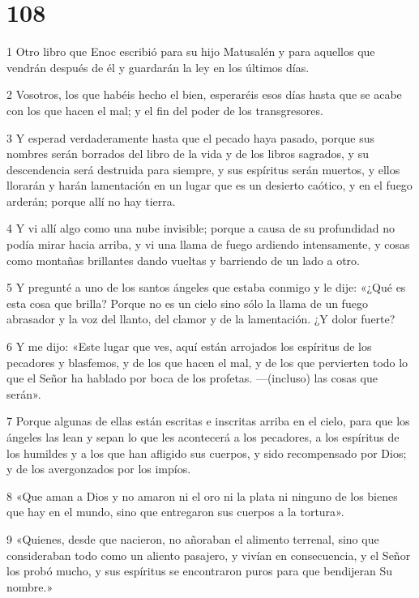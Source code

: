 \chapter{108}

\par 1 Otro libro que Enoc escribió para su hijo Matusalén y para aquellos que vendrán después de él y guardarán la ley en los últimos días.
\par 2 Vosotros, los que habéis hecho el bien, esperaréis esos días hasta que se acabe con los que hacen el mal; y el fin del poder de los transgresores.
\par 3 Y esperad verdaderamente hasta que el pecado haya pasado, porque sus nombres serán borrados del libro de la vida y de los libros sagrados, y su descendencia será destruida para siempre, y sus espíritus serán muertos, y ellos llorarán y harán lamentación en un lugar que es un desierto caótico, y en el fuego arderán; porque allí no hay tierra.
\par 4 Y vi allí algo como una nube invisible; porque a causa de su profundidad no podía mirar hacia arriba, y vi una llama de fuego ardiendo intensamente, y cosas como montañas brillantes dando vueltas y barriendo de un lado a otro.
\par 5 Y pregunté a uno de los santos ángeles que estaba conmigo y le dije: «¿Qué es esta cosa que brilla? Porque no es un cielo sino sólo la llama de un fuego abrasador y la voz del llanto, del clamor y de la lamentación. ¿Y dolor fuerte?
\par 6 Y me dijo: «Este lugar que ves, aquí están arrojados los espíritus de los pecadores y blasfemos, y de los que hacen el mal, y de los que pervierten todo lo que el Señor ha hablado por boca de los profetas. —(incluso) las cosas que serán».
\par 7 Porque algunas de ellas están escritas e inscritas arriba en el cielo, para que los ángeles las lean y sepan lo que les acontecerá a los pecadores, a los espíritus de los humildes y a los que han afligido sus cuerpos, y sido recompensado por Dios; y de los avergonzados por los impíos.
\par 8 «Que aman a Dios y no amaron ni el oro ni la plata ni ninguno de los bienes que hay en el mundo, sino que entregaron sus cuerpos a la tortura».
\par 9 «Quienes, desde que nacieron, no añoraban el alimento terrenal, sino que consideraban todo como un aliento pasajero, y vivían en consecuencia, y el Señor los probó mucho, y sus espíritus se encontraron puros para que bendijeran Su nombre.»
